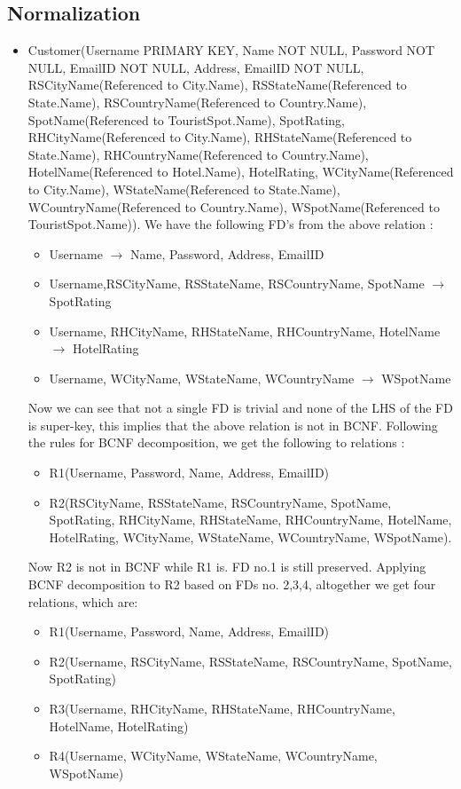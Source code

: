 \documentclass[11pt]{article}
\begin{document}
\subsection{Normalization}
\begin{itemize}
\item Customer(Username PRIMARY KEY, Name NOT NULL, Password NOT NULL, EmailID NOT NULL, Address, EmailID NOT NULL, RSCityName(Referenced to City.Name), RSStateName(Referenced to State.Name), RSCountryName(Referenced to Country.Name), SpotName(Referenced to TouristSpot.Name), SpotRating, RHCityName(Referenced to City.Name), RHStateName(Referenced to State.Name), RHCountryName(Referenced to Country.Name), HotelName(Referenced to Hotel.Name), HotelRating, WCityName(Referenced to City.Name), WStateName(Referenced to State.Name), WCountryName(Referenced to Country.Name), WSpotName(Referenced to TouristSpot.Name)). \newline \newline
We have the following FD’s from the above relation :
\begin{itemize}
\item Username $\rightarrow$ Name, Password, Address, EmailID
\item Username,RSCityName, RSStateName, RSCountryName, SpotName $\rightarrow$ SpotRating
\item Username, RHCityName, RHStateName, RHCountryName, HotelName $\rightarrow$ HotelRating
\item Username, WCityName, WStateName, WCountryName $\rightarrow$ WSpotName
\end{itemize}
Now we can see that not a single FD is trivial and none of the LHS of the FD is super-key, this implies that the above relation is not in BCNF. Following the rules for BCNF decomposition, we get the following to relations :
\begin{itemize}
\item R1(Username, Password, Name, Address, EmailID)
\item R2(RSCityName, RSStateName, RSCountryName, SpotName, SpotRating, RHCityName, RHStateName, RHCountryName, HotelName, HotelRating, WCityName, WStateName, WCountryName, WSpotName).
\end{itemize}
Now R2 is not in BCNF while R1 is. FD no.1 is still preserved. Applying BCNF decomposition to R2 based on FDs no. 2,3,4, altogether we get four relations, which are:
\begin{itemize}
\item R1(Username, Password, Name, Address, EmailID)
\item R2(Username, RSCityName, RSStateName, RSCountryName, SpotName, SpotRating)
\item R3(Username, RHCityName, RHStateName, RHCountryName, HotelName, HotelRating)
\item R4(Username, WCityName, WStateName, WCountryName, WSpotName)
\end{itemize}


\end{itemize}
\end{document}

